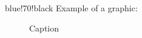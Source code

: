 \documentclass[./main.tex]{subfiles}
\begin{document}
	\begin{color}{blue!70!black}
	    Example of a graphic:
	    \begin{figure}
	        \centering
	        
	        \caption{Caption}
	        \label{fig:my_label}
	    \end{figure}
		\lipsum
	\end{color}
\end{document}
